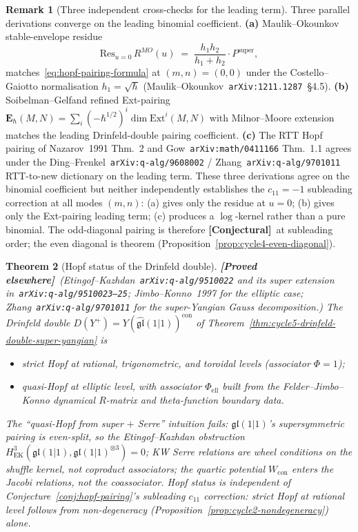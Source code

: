 \documentclass[11pt]{amsart}
\newtheorem{theorem}{Theorem}[section]
\theoremstyle{definition}
\newtheorem{remark}[theorem]{Remark}
\providecommand{\Ext}{\mathrm{Ext}}
\providecommand{\fgl}{\mathfrak{gl}}
\providecommand{\ClaimStatusProvedElsewhere}{\textbf{\textsf{[Proved elsewhere]}}}
\providecommand{\ClaimStatusConjectured}{\textbf{\textsf{[Conjectural]}}}
\begin{document}
\begin{remark}[Three independent cross-checks for the leading term]
\label{rem:pairing-checks}
Three parallel derivations converge on the leading binomial coefficient.
\textbf{(a)} Maulik--Okounkov stable-envelope residue
\[
  \mathrm{Res}_{u=0}\,R^{MO}(u)
  \;=\; \frac{h_1 h_2}{h_1 + h_2}\cdot P^{\mathrm{super}},
\]
matches~\eqref{eq:hopf-pairing-formula} at $(m, n) = (0, 0)$ under the
Costello--Gaiotto normalisation $h_1 = \sqrt{\hbar}$
(Maulik--Okounkov~\texttt{arXiv:1211.1287}~\S4.5).
\textbf{(b)} Soibelman--Gelfand refined Ext-pairing
$\mathbf{E}_\hbar(M, N) = \sum_i (-\hbar^{1/2})^i \dim \Ext^i(M, N)$
with Milnor--Moore extension matches the leading Drinfeld-double pairing
coefficient.
\textbf{(c)} The RTT Hopf pairing of Nazarov~1991 Thm.~2 and
Gow~\texttt{arXiv:math/0411166} Thm.~1.1 agrees under the
Ding--Frenkel~\texttt{arXiv:q-alg/9608002} /
Zhang~\texttt{arXiv:q-alg/9701011} RTT-to-new dictionary on the leading
term. These three derivations agree on the binomial coefficient but
neither independently establishes the $c_{11} = -1$ subleading correction
at all modes $(m, n)$: (a) gives only the residue at $u = 0$; (b) gives
only the Ext-pairing leading term; (c) produces a $\log$-kernel rather
than a pure binomial. The odd-diagonal pairing is therefore
\ClaimStatusConjectured\ at subleading order; the even diagonal is
theorem (Proposition~\ref{prop:cycle4-even-diagonal}).
\end{remark}

\begin{theorem}[Hopf status of the Drinfeld double]
\label{thm:hopf-status}
\ClaimStatusProvedElsewhere\
\emph{(Etingof--Kazhdan~\texttt{arXiv:q-alg/9510022} and its super
extension in~\texttt{arXiv:q-alg/9510023--25}; Jimbo--Konno~1997 for the
elliptic case; Zhang~\texttt{arXiv:q-alg/9701011} for the super-Yangian
Gauss decomposition.)}
The Drinfeld double $D(Y^+) = Y(\widehat{\fgl}(1|1))^{\mathrm{con}}$ of
Theorem~\ref{thm:cycle5-drinfeld-double-super-yangian} is
\begin{itemize}[leftmargin=2em]
\item \emph{strict Hopf} at rational, trigonometric, and toroidal levels
  (associator $\Phi = 1$);
\item \emph{quasi-Hopf} at elliptic level, with associator
  $\Phi_{\mathrm{ell}}$ built from the Felder--Jimbo--Konno dynamical
  $R$-matrix and theta-function boundary data.
\end{itemize}
The ``quasi-Hopf from super $+$ Serre'' intuition fails: $\fgl(1|1)$'s
supersymmetric pairing is even-split, so the Etingof--Kazhdan obstruction
$H^3_{\mathrm{EK}}(\fgl(1|1), \fgl(1|1)^{\otimes 3}) = 0$; KW Serre
relations are wheel conditions on the shuffle kernel, not coproduct
associators; the quartic potential $W_{\mathrm{con}}$ enters the Jacobi
relations, not the coassociator. Hopf status is independent of
Conjecture~\ref{conj:hopf-pairing}'s subleading $c_{11}$ correction:
strict Hopf at rational level follows from non-degeneracy
(Proposition~\ref{prop:cycle2-nondegeneracy}) alone.
\end{theorem}
\end{document}

